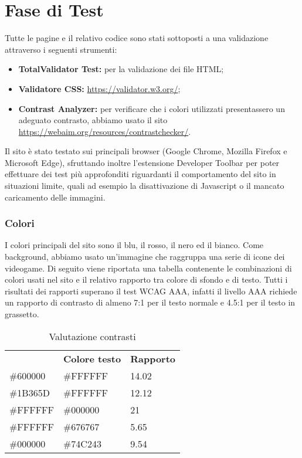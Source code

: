 \section{Fase di Test}
Tutte le pagine e il relativo codice sono stati sottoposti a una validazione attraverso i seguenti strumenti:
\begin{itemize}
	\item \textbf{TotalValidator Test:} per la validazione dei file HTML;
	\item \textbf{Validatore CSS:} \url{https://validator.w3.org/};
	\item \textbf{Contrast Analyzer:} per verificare che i colori utilizzati presentassero un adeguato contrasto, abbiamo usato il sito \url{https://webaim.org/resources/contrastchecker/}.
\end{itemize}
Il sito è stato testato sui principali browser (Google Chrome, Mozilla Firefox e Microsoft Edge), sfruttando inoltre l'estensione Developer Toolbar per poter effettuare 
dei test più approfonditi riguardanti il comportamento del sito in situazioni limite, quali ad esempio la disattivazione di Javascript o il mancato caricamento delle immagini.

\subsubsection{Colori}
I colori principali del sito sono il blu, il rosso, il nero ed il bianco. Come background, abbiamo usato un’immagine che raggruppa una serie di icone dei videogame. Di seguito viene riportata una tabella contenente le combinazioni di colori usati nel sito e il relativo rapporto tra colore di sfondo e di testo. Tutti i risultati dei rapporti superano il test WCAG AAA, infatti il livello AAA richiede un rapporto di contrasto di almeno 7:1 per il testo normale e 4.5:1 per il testo in grassetto.

\begin{center}
	\renewcommand{\arraystretch}{1.8}
	\begin{longtable}[H]{| p{.18\hsize} | p{.18\hsize} | p{.18\hsize} |}
		\caption{Valutazione contrasti}\\
		\rowcolor[HTML]{C14638}
		\multicolumn{1}{c}{\color[HTML]{FFFFFF} \textbf{Colore sfondo}} &
		\multicolumn{1}{c}{\color[HTML]{FFFFFF} \textbf{Colore testo}} &
		\multicolumn{1}{c}{\color[HTML]{FFFFFF} \textbf{Rapporto}} \\
		
		\#600000 & \#FFFFFF & 14.02 \\
		\hline
		\#1B365D & \#FFFFFF & 12.12 \\
		\hline
		\#FFFFFF & \#000000 & 21 \\
		\hline
		\#FFFFFF & \#676767 & 5.65 \\
		\hline
		\#000000 & \#74C243 & 9.54 \\
		\hline
	\end{longtable}
\end{center}

